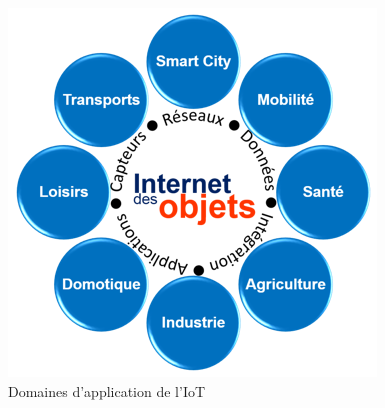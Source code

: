 	\begin{figure}[H]
		\begin{center}
			\includegraphics{IMAGES/ORIGINALS/Application_IoT}
		\end{center}
		\caption{Domaines d'application de l'IoT}
	\end{figure}


